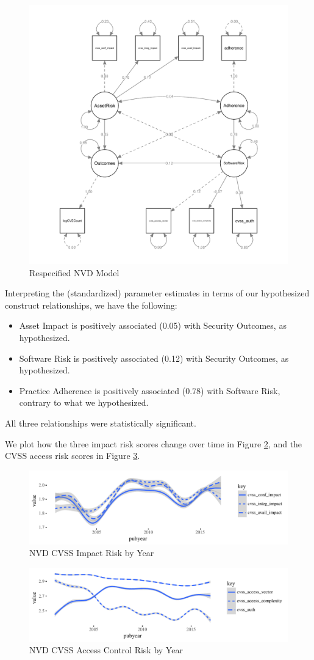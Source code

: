 \begin{figure}
	\centering
	\includegraphics[width=.6\textwidth]{NVD_Respecified_SEM_Model.pdf}
	\caption{Respecified NVD Model}
	\label{fig:nvd_model_respecified_estimates}
\end{figure}

Interpreting the (standardized) parameter estimates in terms of our hypothesized construct relationships, we have the following:
\begin{itemize}
	\item  Asset Impact is positively associated (0.05) with Security Outcomes, as hypothesized.
	\item Software Risk is positively associated (0.12) with Security Outcomes, as hypothesized. 
	\item Practice Adherence is positively associated (0.78) with Software Risk, contrary to what we hypothesized. 
\end{itemize}	
All three relationships were statistically significant. 

We plot how the three impact risk scores change over time in Figure \ref{fig:nvd_vulns_impact}, and the CVSS access risk scores in Figure \ref{fig:nvd_vulns_auth}. 	
		
\begin{figure}
	\centering
	\includegraphics[width=\columnwidth]{nvd_cvss_impact}
	\caption{NVD CVSS Impact Risk by Year}
	\label{fig:nvd_vulns_impact}
\end{figure}

\begin{figure}
	\centering
	\includegraphics[width=\columnwidth]{nvd_cvss_auth}
	\caption{NVD CVSS Access Control Risk by Year}
	\label{fig:nvd_vulns_auth}
\end{figure}
